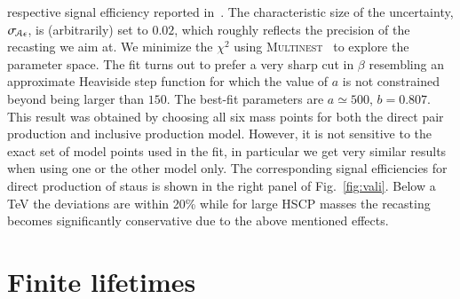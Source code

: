 \documentclass[preprint,number,sort&compress,twocolumn,3p]{elsstyarticle}
\newcommand{\com}[1]{\emph{\color{red}[#1]}}  %
\begin{document}
\begin{appendix}
respective signal efficiency reported in~\cite{CMS-PAS-EXO-16-036}. The
characteristic size of the uncertainty, $\sigma_{\!{\cal A}\epsilon}$, is (arbitrarily) set to $0.02$, which roughly
reflects the precision of the recasting we aim at.
We minimize the $\chi^2$ using \textsc{Multinest}~\cite{Feroz:2008xx,Feroz:2013hea} 
to explore the parameter space. The fit turns out to prefer a very sharp cut in $\beta$ resembling 
an approximate Heaviside step function for which the value of 
$a$ is not constrained beyond being larger than $150$. 
The best-fit parameters are $a\simeq 500 $, $b=0.807$. This result was obtained by choosing all 
six mass points for both the direct pair production and inclusive production model. However, it is not sensitive
to the exact set of model points used in the fit, in particular we get very similar results when using one or the other model only. 
The corresponding signal efficiencies
for direct production of staus is shown in the right panel of Fig.~\ref{fig:vali}.
Below a TeV the deviations are within 20\% while for large HSCP masses the 
recasting becomes significantly conservative due to the above mentioned effects.



%
%
%


\section{Finite lifetimes}\label{app:lifetime}


\end{appendix}
\end{document}

